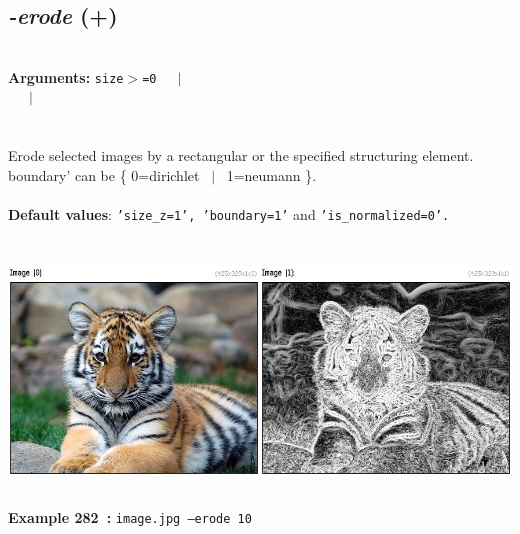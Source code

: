 \documentclass[a4paper,11pt,twoside]{book}
\begin{document}
\subsection{\emph{-erode} (+)}\vspace*{-0.5em}
~\\\textbf{Arguments: } 
{\small \texttt{size$>$=0}}~~~$|$\\
~~~$|$\\
\\~\\
Erode selected images by a rectangular or the specified structuring element.
boundary' can be \{ 0=dirichlet ~$|$~ 1=neumann \}.
~\\~\\\textbf{Default values}: {\small \texttt{'size\_z=1', 'boundary=1'} and \texttt{'is\_normalized=0'.}}
\begin{center}\includegraphics[keepaspectratio=true,height=7cm,width=\textwidth]{img/gmic_def282.jpg}\\
{\footnotesize \textbf{Example 282~:} \texttt{image.jpg --erode 10}}
\end{center}
\end{document}
